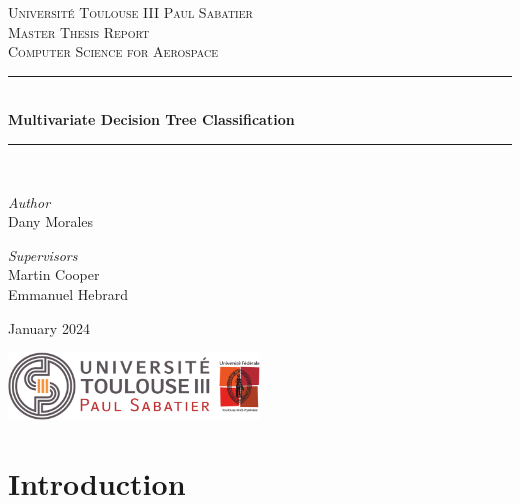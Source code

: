 \documentclass[12pt]{report}
\theoremstyle{definition}
\theoremstyle{definition}
\theoremstyle{definition}
\begin{document}
\begin{titlepage}
    \newcommand{\HRule}{\rule{\linewidth}{0.5mm}} %
    \center
    \textsc{\LARGE Université Toulouse III Paul Sabatier}\\[2.5cm]
    \textsc{\Large Master Thesis Report}\\[0.5cm]
    \textsc{\large Computer Science for Aerospace}\\[2.5cm]

    \HRule\\[0.5cm]
    {\huge \bf Multivariate Decision Tree Classification}\\[0.5cm]
    \HRule\\[1.5cm]

    \begin{minipage}{0.4\textwidth}
		\begin{flushleft}
			\large
			\textit{Author}\\
			Dany Morales
		\end{flushleft}
	\end{minipage}
    \begin{minipage}{0.4\textwidth}
		\begin{flushright}
			\large
			\textit{Supervisors}\\
			Martin Cooper\\
            Emmanuel Hebrard
		\end{flushright}
	\end{minipage}

    \vfill
    \large January 2024

    \includegraphics[width=0.5\textwidth]{logo.png}
\end{titlepage}

\newpage
\tableofcontents

\newpage
\chapter*{Introduction}
\end{document}
